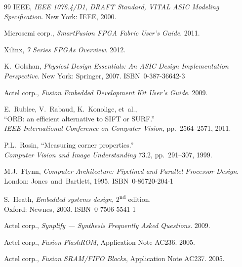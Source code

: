 \documentclass[12pt,a4paper]{article}
\newcommand{\nd}{\textsuperscript{nd} }
\begin{document}
{\begin{thebibliography}{99}
			IEEE,
			\textit{IEEE 1076.4/D1, DRAFT Standard, VITAL ASIC Modeling Specification}.
			New York: IEEE, 2000.

			Microsemi corp.,
			\textit{SmartFusion FPGA Fabric User's Guide}.
			2011.

			Xilinx,
			\textit{7 Series FPGAs Overview}.
			2012.

			K.~Golshan,
			\textit{Physical Design Essentials: An ASIC Design Implementation Perspective}.
			New York: Springer, 2007. ISBN~0-387-36642-3

			Actel corp.,
			\textit{Fusion Embedded Development Kit User's Guide}.
			2009.

			E.~Rublee, V.~Rabaud, K.~Konolige, et~al.,\\
			``ORB: an efficient alternative to SIFT or SURF.''\\
			\textit{IEEE International Conference on Computer Vision},
			pp.~2564--2571, 2011.

			P.L.~Rosin,
			``Measuring corner properties.''\\
			\textit{Computer Vision and Image Understanding} 73.2,
			pp.~291--307, 1999.

			M.J.~Flynn,
			\textit{Computer Architecture: Pipelined and Parallel Processor Design}.
			\linebreak[3]
			London: Jones~and~Bartlett, 1995. ISBN~0-86720-204-1

			S.~Heath,
			\textit{Embedded systems design}, 2\nd edition.\\
			Oxford: Newnes, 2003. ISBN~0-7506-5541-1

			Actel corp.,
			\textit{Synplify — Synthesis Frequently Asked Questions}.
			2009.

			Actel corp.,
			\textit{Fusion FlashROM}, Application Note AC236.
			2005.

			Actel corp.,
			\textit{Fusion SRAM/FIFO Blocks}, Application Note AC237.
			2005.

	\end{thebibliography}
	} %
	
	\clearpage
	
	
	\clearpage
	\begin{appendices} %
	
	\end{appendices}
\end{document}
